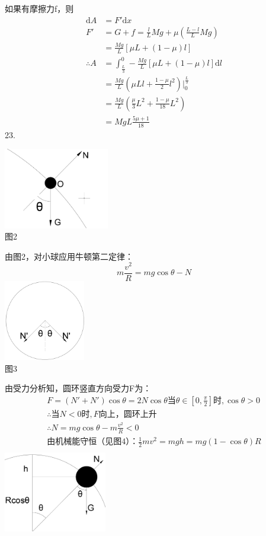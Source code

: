 \documentclass[b5paper,opensource]{./template/qyxf-book}
\newcommand{\di}[1]{\mathrm{d}#1}
\begin{document}
如果有摩擦力f，则
\begin{align*}
\di{A}	&=F'\di{x}\\
F'		&=G+f=\frac{l}{L}Mg+\mu\left(\frac{L-l}{L}Mg\right)\\
&=\frac{Mg}{L}[\mu L+(1-\mu)l]\\
\therefore A&=\int_{\frac{L}{3}}^{0} -\frac{Mg}{L}[\mu L+(1-\mu)l] \di{l}\\
&=\frac{Mg}{L}\left(\mu Ll+\frac{1-\mu}{2}l^2\right)\left.\right|_{0}^{\frac{L}{3}}\\
&=\frac{Mg}{L}\left(\frac{\mu}{3}L^2+\frac{1-\mu}{18}L^2\right)\\
&=MgL\frac{5\mu +1}{18}
\end{align*}
23.\par
\centering\includegraphics[height=100pt]{Chp2_illus2.png}\\
图2\\
\raggedright 由图2，对小球应用牛顿第二定律：
\[m\frac{v^2}{R}=mg\cos\theta-N\]
\centering\includegraphics[height=100pt]{Chp2_illus3.png}\\
图3\\
\raggedright 由受力分析知，圆环竖直方向受力F为：
\begin{gather*}
F=(N'+N')\cos\theta=2N\cos\theta
\text{当}\theta\in[0,\frac{\pi}{2}]\text{时},\cos\theta>0\\
\therefore\text{当}N<0\text{时},F\text{向上，圆环上升}\\
\therefore N=mg\cos\theta-m\frac{v^2}{R}<0\\
\text{由机械能守恒（见图4）：}\frac{1}{2}mv^2=mgh=mg(1-\cos\theta)R\\
\end{gather*}
\centering\includegraphics[height=100pt]{Chp2_illus4.png}\\
\end{document}
